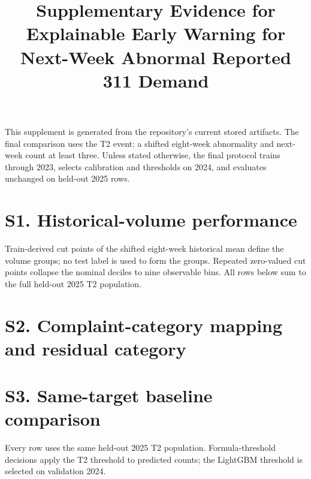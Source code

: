 \documentclass[10pt]{article}
\title{Supplementary Evidence for\\Explainable Early Warning for Next-Week Abnormal Reported 311 Demand}
\author{}
\date{}
\begin{document}
\maketitle
\noindent This supplement is generated from the repository's current stored artifacts. The final comparison uses the T2 event: a shifted eight-week abnormality and next-week count at least three. Unless stated otherwise, the final protocol trains through 2023, selects calibration and thresholds on 2024, and evaluates unchanged on held-out 2025 rows.

\section*{S1. Historical-volume performance}
Train-derived cut points of the shifted eight-week historical mean define the volume groups; no test label is used to form the groups. Repeated zero-valued cut points collapse the nominal deciles to nine observable bins. All rows below sum to the full held-out 2025 T2 population.
\begin{table}[H]
\centering\scriptsize

\caption{Final Platt-calibrated LightGBM performance by train-derived historical-volume group on held-out 2025 T2 rows.}\label{tab:supp-volume}
\end{table}
\clearpage

\section*{S2. Complaint-category mapping and residual category}
\begin{table}[H]
\centering\small

\caption{Deterministic mapping of original 311 complaint types to the nine analysis categories.}\label{tab:supp-mapping}
\end{table}
\begin{table}[H]
\centering\small

\caption{Largest original complaint types in the residual \texttt{other} category.}\label{tab:supp-other}
\end{table}
\clearpage

\section*{S3. Same-target baseline comparison}
Every row uses the same held-out 2025 T2 population. Formula-threshold decisions apply the T2 threshold to predicted counts; the LightGBM threshold is selected on validation 2024.
\begin{table}[H]
\centering\scriptsize

\caption{Full baseline metrics on the shared T2 task.}\label{tab:supp-baselines}
\end{table}
\clearpage
\end{document}
